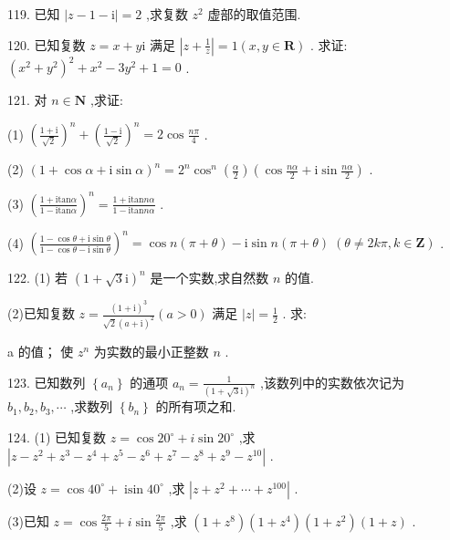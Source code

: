 \documentclass[10pt]{article}
\newcommand*\circled[1]{\tikz[baseline=(char.base)]{\node[shape=circle,draw,inner sep=1.5pt] (char) {\small #1};}}
\begin{document}
119. 已知 \(\left| {z - 1 - \mathrm{i}}\right|  = 2\) ,求复数 \({z}^{2}\) 虚部的取值范围.

120. 已知复数 \(z = x + y\mathrm{i}\) 满足 \(\left| {z + \frac{1}{z}}\right|  = 1\left( {x,y \in  \mathbf{R}}\right)\) . 求证: \({\left( {x}^{2} + {y}^{2}\right) }^{2} + {x}^{2} - 3{y}^{2} + 1 = 0\) .

121. 对 \(n \in  \mathbf{N}\) ,求证:

(1) \({\left( \frac{1 + \mathrm{i}}{\sqrt{2}}\right) }^{n} + {\left( \frac{1 - \mathrm{i}}{\sqrt{2}}\right) }^{n} = 2\cos \frac{n\pi }{4}\) .

(2) \({\left( 1 + \cos \alpha  + \mathrm{i}\sin \alpha \right) }^{n} = {2}^{n}{\cos }^{n}\left( \frac{\alpha }{2}\right) \left( {\cos \frac{n\alpha }{2} + \mathrm{i}\sin \frac{n\alpha }{2}}\right)\) .

(3) \({\left( \frac{1 + \mathrm{{itan}}\alpha }{1 - \mathrm{{itan}}\alpha }\right) }^{n} = \frac{1 + \mathrm{{itan}}{n\alpha }}{1 - \mathrm{{itan}}{n\alpha }}\) .

(4) \({\left( \frac{1 - \cos \theta  + \mathrm{i}\sin \theta }{1 - \cos \theta  - \mathrm{i}\sin \theta }\right) }^{n} = \cos n\left( {\pi  + \theta }\right)  - \mathrm{i}\sin n\left( {\pi  + \theta }\right) \;\left( {\theta  \neq  {2k\pi },k \in  \mathbf{Z}}\right)\) .

122. (1) 若 \({\left( 1 + \sqrt{3}\mathrm{i}\right) }^{n}\) 是一个实数,求自然数 \(n\) 的值.

(2)已知复数 \(z = \frac{{\left( 1 + \mathrm{i}\right) }^{3}}{\sqrt{2}{\left( a + \mathrm{i}\right) }^{2}}\left( {a > 0}\right)\) 满足 \(\left| z\right|  = \frac{1}{2}\) . 求:

 \circled{1} a 的值；  \circled{2} 使 \({z}^{n}\) 为实数的最小正整数 \(n\) .

123. 已知数列 \(\left\{  {a}_{n}\right\}\) 的通项 \({a}_{n} = \frac{1}{{\left( 1 + \sqrt{3}\mathrm{i}\right) }^{n}}\) ,该数列中的实数依次记为 \({b}_{1},{b}_{2},{b}_{3},\cdots\) ,求数列 \(\left\{  {b}_{n}\right\}\) 的所有项之和.

124. (1) 已知复数 \(z = \cos {20}^{ \circ  } + i\sin {20}^{ \circ  }\) ,求 \(\left| {z - {z}^{2} + {z}^{3} - {z}^{4} + {z}^{5} - {z}^{6} + {z}^{7} - {z}^{8} + {z}^{9} - {z}^{10}}\right|\) .

(2)设 \(z = \cos {40}^{ \circ  } + \operatorname{isin}{40}^{ \circ  }\) ,求 \(\left| {z + {z}^{2} + \cdots  + {z}^{100}}\right|\) .

(3)已知 \(z = \cos \frac{2\pi }{5} + i\sin \frac{2\pi }{5}\) ,求 \(\left( {1 + {z}^{8}}\right) \left( {1 + {z}^{4}}\right) \left( {1 + {z}^{2}}\right) \left( {1 + z}\right)\) .
\end{document}
